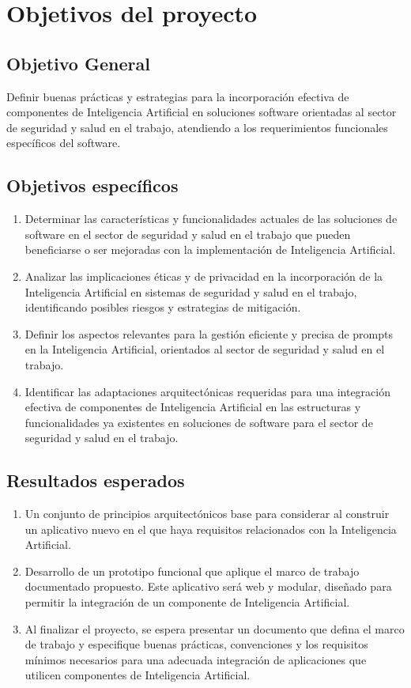 \section{Objetivos del proyecto}
\subsection{Objetivo General}
Definir buenas prácticas y estrategias para la incorporación efectiva de componentes de Inteligencia Artificial en soluciones software orientadas al sector de seguridad y salud en el trabajo, atendiendo a los requerimientos funcionales específicos del software.

\subsection{Objetivos específicos}
\begin{enumerate}
    \item Determinar las características y funcionalidades actuales de las soluciones de software en el sector de seguridad y salud en el trabajo que pueden beneficiarse o ser mejoradas con la implementación de Inteligencia Artificial.
    \item Analizar las implicaciones éticas y de privacidad en la incorporación de la Inteligencia Artificial en sistemas de seguridad y salud en el trabajo, identificando posibles riesgos y estrategias de mitigación.
    \item Definir los aspectos relevantes para la gestión eficiente y precisa de prompts en la Inteligencia Artificial, orientados al sector de seguridad y salud en el trabajo.
    \item Identificar las adaptaciones arquitectónicas requeridas para una integración efectiva de componentes de Inteligencia Artificial en las estructuras y funcionalidades ya existentes en soluciones de software para el sector de seguridad y salud en el trabajo.
\end{enumerate}

\subsection{Resultados esperados}
\begin{enumerate}
    \item Un conjunto de principios arquitectónicos base para considerar al construir un aplicativo nuevo en el que haya requisitos relacionados con la Inteligencia Artificial.
    \item Desarrollo de un prototipo funcional que aplique el marco de trabajo documentado propuesto. Este aplicativo será web y modular, diseñado para permitir la integración de un componente de Inteligencia Artificial.
    \item Al finalizar el proyecto, se espera presentar un documento que defina el marco de trabajo y especifique buenas prácticas, convenciones y los requisitos mínimos necesarios para una adecuada integración de aplicaciones que utilicen componentes de Inteligencia Artificial.
\end{enumerate}